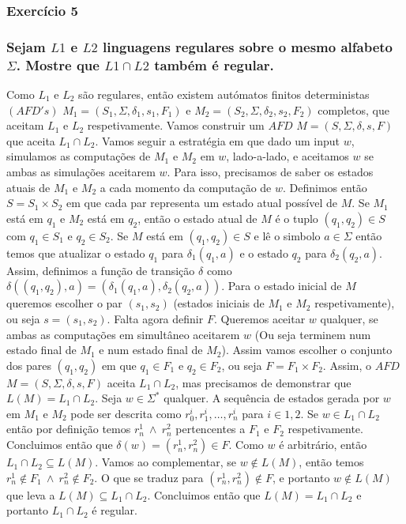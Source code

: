 \subsubsection{Exercício 5}

\subsubsection*{Sejam $L1$ e $L2$ linguagens regulares sobre o mesmo alfabeto $\Sigma$. Mostre que $L1 \cap L2$ também é regular.}

\begin{spacing}{1.5}
  Como $L_1$ e $L_2$ são regulares, então existem autómatos finitos deterministas
  $(AFD's)$ $M_1 = (S_1, \Sigma, \delta_1, s_1, F_1)$ e $M_2 = (S_2, \Sigma, \delta_2, s_2, F_2)$ completos, que aceitam $L_1$ e $L_2$ respetivamente. Vamos construir um $AFD$ $M = (S, \Sigma, \delta, s, F)$ que aceita $L_1 \cap L_2$.
  Vamos seguir a estratégia em que dado um input $w$, simulamos as computações de $M_1$ e $M_2$ em $w$, lado-a-lado, e aceitamos $w$ se ambas as simulações aceitarem $w$. Para isso, precisamos de saber os estados atuais de $M_1$ e $M_2$ a cada momento da computação de $w$. Definimos então $S = S_1 \times S_2$ em que cada par representa um estado atual possível de $M$. Se $M_1$ está em $q_1$ e $M_2$ está em $q_2$, então o estado atual de $M$ é o tuplo $(q_1, q_2) \in S$ com $q_1 \in S_1$ e $q_2 \in S_2$. Se $M$ está em $(q_1,q_2) \in S$ e lê o simbolo $a \in \Sigma$ então temos que atualizar o estado $q_1$ para $\delta_1(q_1, a)$ e o estado $q_2$ para $\delta_2(q_2, a)$. Assim, definimos a função de transição $\delta$ como $\delta((q_1,q_2), a) = (\delta_1(q_1, a), \delta_2(q_2, a))$. Para o estado inicial de $M$ queremos escolher o par $(s_1,s_2)$ (estados iniciais de $M_1$ e $M_2$ respetivamente), ou seja $s = (s_1,s_2)$. Falta agora definir $F$. Queremos aceitar $w$ qualquer, se ambas as computações em simultâneo aceitarem $w$ (Ou seja terminem num estado final de $M_1$ e num estado final de $M_2$). Assim vamos escolher o conjunto dos pares $(q_1,q_2)$ em que $q_1 \in F_1$ e $q_2 \in F_2$, ou seja $F = F_1 \times F_2$. Assim, o $AFD$ $M = (S, \Sigma, \delta, s, F)$ aceita $L_1 \cap L_2$, mas precisamos de demonstrar que $L(M) = L_1 \cap L_2$. Seja $w \in \Sigma^{*}$ qualquer. A sequência de estados gerada por $w$ em $M_1$ e $M_2$ pode ser descrita como $r_0^{i}, r_1^{i}, \hdots, r_n^{i}$ para $i \in {1,2}$. Se $w \in L_1 \cap L_2$ então por definição temos $r_n^{1} \ \wedge \ r_n^{2}$ pertencentes a $F_1$ e $F_2$ respetivamente. Concluimos então que $\delta(w) = (r_n^{1},r_n^{2}) \in F$. Como $w$ é arbitrário, então $L_1 \cap L_2 \subseteq L(M)$. Vamos ao complementar, se $w \notin L(M)$, então temos $r_n^{1} \notin F_1 \ \wedge \ r_n^{2} \notin F_2$. O que se traduz para $(r_n^{1},r_n^{2}) \notin F$, e portanto $w \notin L(M)$ que leva a $L(M) \subseteq L_1 \cap L_2$. Concluimos então que $L(M) = L_1 \cap L_2$ e portanto $L_1 \cap L_2$ é regular.
\end{spacing}